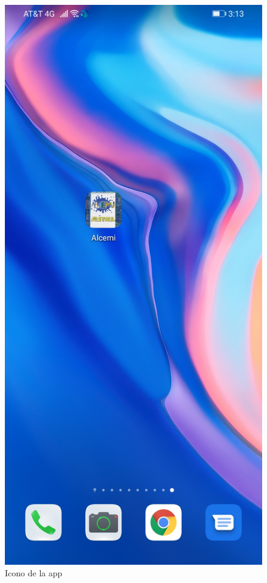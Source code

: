 \documentclass{article}
\begin{document}
\begin{figure}[h]
\begin{minipage}[t]{0.5\linewidth}
\caption {Icono de la app}
\centering
\includegraphics[scale=0.16]{fig10}
\end{minipage}

\end{figure}
\end{document}
